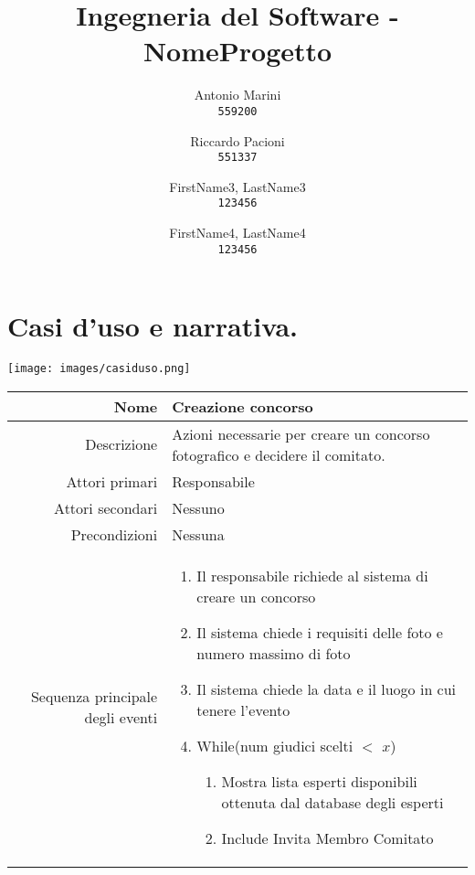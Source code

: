 \documentclass{article}
\title{Ingegneria del Software - NomeProgetto}
\author{
  Antonio Marini\\
  \texttt{559200}
  \and
  Riccardo Pacioni\\
  \texttt{551337}
  \and
  FirstName3, LastName3\\
  \texttt{123456}
  \and
  FirstName4, LastName4\\
  \texttt{123456}
}
\begin{document}
\maketitle

\newpage

\section{Casi d'uso e narrativa.}

\texttt{[image: images/casiduso.png]}

\begin{center}
    \begin{tabular}{ |r|p{9cm}| }
        \hline
        Nome                              & Creazione concorso                                                           \\
        \hline
        Descrizione                       & Azioni necessarie per creare un concorso fotografico e decidere il comitato. \\
        \hline
        Attori primari                    & Responsabile                                                                 \\
        \hline
        Attori secondari                  & Nessuno                                                                      \\
        \hline
        Precondizioni                     & Nessuna                                                                      \\
        \hline
        Sequenza principale degli eventi  &
        \begin{enumerate}
            \item Il responsabile richiede al sistema di creare un concorso
            \item Il sistema chiede i requisiti delle foto e numero massimo di foto
            \item Il sistema chiede la data e il luogo in cui tenere l’evento
            \item While(num giudici scelti $<$ $x$)
                  \begin{enumerate}
                      \item Mostra lista esperti disponibili ottenuta dal database degli esperti
                      \item Include Invita Membro Comitato
                  \end{enumerate}
        \end{enumerate}

\end{tabular}
\end{center}
\end{document}
